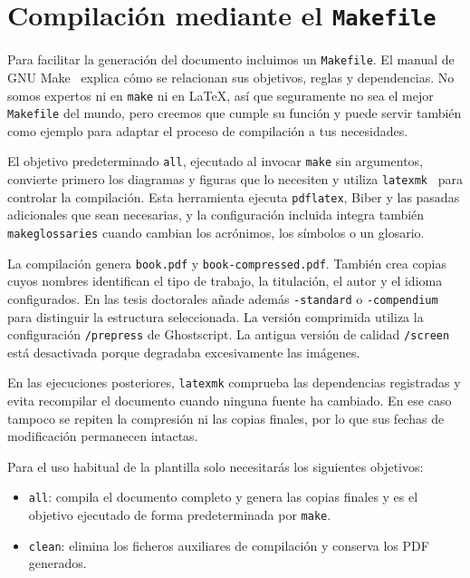 \section{Compilación mediante el \texttt{Makefile}}
\label{sec:compilacion-makefile}

Para facilitar la generación del documento incluimos un \texttt{Makefile}. El manual de GNU Make~\cite{make} explica cómo se relacionan sus objetivos, reglas y dependencias. No somos expertos ni en \texttt{make} ni en \LaTeX{}, así que seguramente no sea el mejor \texttt{Makefile} del mundo, pero creemos que cumple su función y puede servir también como ejemplo para adaptar el proceso de compilación a tus necesidades.

El objetivo predeterminado \texttt{all}, ejecutado al invocar \texttt{make} sin argumentos, convierte primero los diagramas y figuras que lo necesiten y utiliza \texttt{latexmk}~\cite{latexmk-manual} para controlar la compilación. Esta herramienta ejecuta \texttt{pdflatex}, Biber y las pasadas adicionales que sean necesarias, y la configuración incluida integra también \texttt{makeglossaries} cuando cambian los acrónimos, los símbolos o un glosario.

La compilación genera \texttt{book.pdf} y \texttt{book-compressed.pdf}. También crea copias cuyos nombres identifican el tipo de trabajo, la titulación, el autor y el idioma configurados. En las tesis doctorales añade además \texttt{-standard} o \texttt{-compendium} para distinguir la estructura seleccionada. La versión comprimida utiliza la configuración \texttt{/prepress} de Ghostscript. La antigua versión de calidad \texttt{/screen} está desactivada porque degradaba excesivamente las imágenes.

En las ejecuciones posteriores, \texttt{latexmk} comprueba las dependencias registradas y evita recompilar el documento cuando ninguna fuente ha cambiado. En ese caso tampoco se repiten la compresión ni las copias finales, por lo que sus fechas de modificación permanecen intactas.

Para el uso habitual de la plantilla solo necesitarás los siguientes objetivos:

\begin{itemize}
  \item \texttt{all}: compila el documento completo y genera las copias finales y es el objetivo ejecutado de forma predeterminada por \texttt{make}.
  \item \texttt{clean}: elimina los ficheros auxiliares de compilación y conserva los PDF generados.
\end{itemize}


